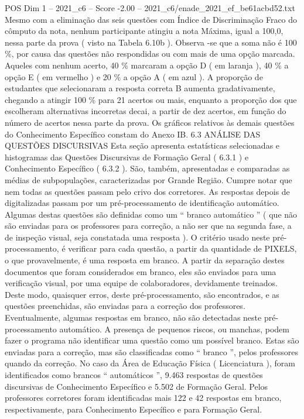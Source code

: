 \begin{textsample}{POS Dim 1 – 2021\_c6 – Score -2.00 – 2021\_c6/enade\_2021\_ef\_be61acbd52.txt}
Mesmo com a eliminação das seis questões com Índice de Discriminação Fraco do cômputo da nota, nenhum participante atingiu a nota Máxima, igual a 100,0, nessa parte da prova ( visto na Tabela 6.10b ).
Observa -se que a soma não é 100 \%, por causa das questões não respondidas ou com mais de uma opção marcada.
Aqueles com nenhum acerto, 40 \% marcaram a opção D ( em laranja ), 40 \% a opção E ( em vermelho ) e 20 \% a opção A ( em azul ).
A proporção de estudantes que selecionaram a resposta correta B aumenta gradativamente, chegando a atingir 100 \% para 21 acertos ou mais, enquanto a proporção dos que escolheram alternativas incorretas decai, a partir de dez acertos, em função do número de acertos nessa parte da prova.
Os gráficos relativos às demais questões do Conhecimento Específico constam do Anexo IB. 6.3 ANÁLISE DAS QUESTÕES DISCURSIVAS Esta seção apresenta estatísticas selecionadas e histogramas das Questões Discursivas de Formação Geral ( 6.3.1 ) e Conhecimento Específico ( 6.3.2 ).
São, também, apresentadas e comparadas as médias de subpopulações, caracterizadas por Grande Região.
Cumpre notar que nem todas as questões passam pelo crivo dos corretores.
As respostas depois de digitalizadas passam por um pré-processamento de identificação automático.
Algumas destas questões são definidas como um “ branco automático ” ( que não são enviadas para os professores para correção, a não ser que na segunda fase, a de inspeção visual, seja constatada uma resposta ).
O critério usado neste pré-processamento, é verificar para cada questão, a partir da quantidade de PIXELS, o que provavelmente, é uma resposta em branco.
A partir da separação destes documentos que foram considerados em branco, eles são enviados para uma verificação visual, por uma equipe de colaboradores, devidamente treinados.
Deste modo, quaisquer erros, deste pré-processamento, são encontrados, e as questões preenchidas, são enviadas para a correção dos professores.
Eventualmente, algumas respostas em branco, não são detectadas neste pré-processamento automático.
A presença de pequenos riscos, ou manchas, podem fazer o programa não identificar uma questão como um possível branco.
Estas são enviadas para a correção, mas são classificadas como “ branco ”, pelos professores quando da correção.
No caso da Área de Educação Física ( Licenciatura ), foram identificados como brancos “ automáticos ”, 9.463 respostas de questões discursivas de Conhecimento Específico e 5.502 de Formação Geral.
Pelos professores corretores foram identificadas mais 122 e 42 respostas em branco, respectivamente, para Conhecimento Específico e para Formação Geral.

\end{textsample}
